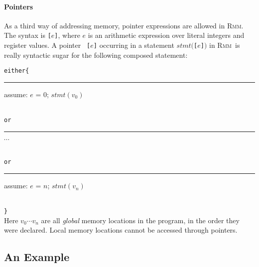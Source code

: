 \documentclass[a4paper]{article}
\newcommand{\rmm}{\textsc{Rmm}}
\begin{document}
\paragraph{Pointers}
As a third way of addressing memory, pointer expressions are allowed
in \rmm. The syntax is {\tt [$e$]}, where $e$ is an arithmetic
expression over literal integers and register values. A pointer {\tt
  [$e$]} occurring in a statement $stmt(${\tt [$e$]}$)$ in \rmm\ is
really syntactic sugar for the following composed statement:

\noindent
{\tt either\{}\\
{\tt \rule{5pt}{0pt} assume: $e$ = 0; $stmt(v_0)$}\\
{\tt or}\\
{\tt \rule{5pt}{0pt} $\cdots$}\\
{\tt or}\\
{\tt \rule{5pt}{0pt} assume: $e$ = $n$; $stmt(v_n)$}\\
{\tt \}}\\

Here $v_0 \cdots v_n$ are all {\em global} memory locations in the
program, in the order they were declared. Local memory locations
cannot be accessed through pointers.

\subsection{An Example}
\end{document}
